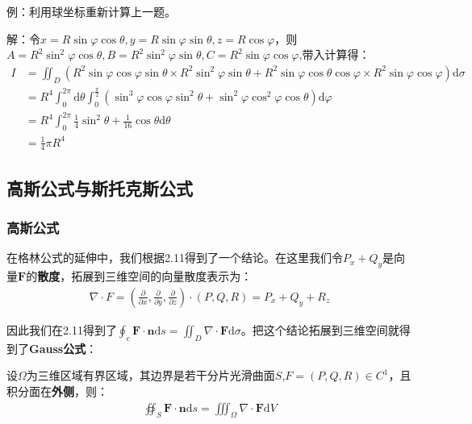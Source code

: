 \documentclass{ctexart}
\let\oldtextbf\textbf
\renewcommand{\textbf}[1]{\textcolor{brown!50!red}{\oldtextbf{#1}}}
\begin{document}
例：利用球坐标重新计算上一题。

解：令$x=R\sin\varphi\cos\theta,y=R\sin\varphi\sin\theta,z=R\cos\varphi$，则$A=R^2\sin^2\varphi\cos\theta,B=R^2\sin^2\varphi\sin\theta,C=R^2\sin\varphi\cos\varphi$,带入计算得：
\begin{align*}
 I&=\iint_D (R^2\sin\varphi\cos\varphi\sin\theta\times R^2\sin^2\varphi\sin\theta
+R^2\sin\varphi\cos\theta\cos\varphi\times R^2\sin\varphi\cos\varphi)\mathrm{d}\sigma \\
&=R^4\int_0^{2\pi}\mathrm{d}\theta\int_0^\frac{\pi}{2} 
(\sin^3\varphi\cos\varphi\sin^2\theta+\sin^2\varphi\cos^2\varphi\cos\theta)\mathrm{d}\varphi
\\&=R^4\int_0^{2\pi}\frac{1}{4}\sin^2\theta+\frac{1}{16}\cos\theta\mathrm{d}\theta\\ 
&=\frac{1}{4} \pi R^4
\end{align*}

\subsection{高斯公式与斯托克斯公式}
\subsubsection{高斯公式}
在格林公式的延伸中，我们根据2.11得到了一个结论。在这里我们令$P_x+Q_y$是向量$\bm{F}$的\textbf{\color{brown!50!red}散度}，拓展到三维空间的向量散度表示为：
\begin{align*}
    \nabla\cdot F=(\frac{\partial}{\partial x},\frac{\partial}{\partial y},
\frac{\partial}{\partial z})\cdot(P,Q,R)=P_x+Q_y+R_z
\end{align*}

因此我们在2.11得到了$\oint_c \bm{F}\cdot \bm{n}\mathrm{d}s=\iint_D\nabla\cdot\bm{F}\mathrm{d}\sigma$。把这个结论拓展到三维空间就得到了\textbf{\color{brown!50!red}Gauss公式}：

\begin{tcolorbox}[
    colback=bac2,     %
    colframe=fra2,   %
    coltitle=white,             %
    coltext=tex2,
    title=Gauss公式,
    fonttitle=\bfseries,        %
arc=3mm,                     %
breakable
]
设$\Omega$为三维区域有界区域，其边界是若干分片光滑曲面$S$,$F=(P,Q,R)\in C^1$，且积分面在\textbf{\color{brown!50!red}外侧}，则：
\begin{align*}
   \oiint_S \bm{F}\cdot \bm{n}\mathrm{d}s=\iiint_\Omega\nabla\cdot\bm{F}\mathrm{d}V\tag{3-7} 
\end{align*}
\end{tcolorbox}
\end{document}
